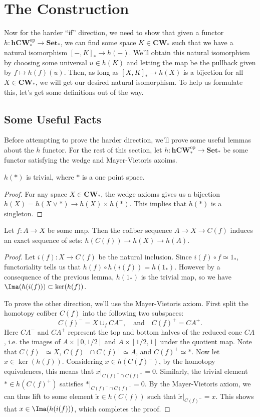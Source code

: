 \documentclass[11pt,letterpaper]{article}
\providecommand{\hcwop}{\mathbf{hCW}^{\textrm{op}}_*}
\providecommand{\cw}{\mathbf{CW}_*}
\providecommand{\Set}{\mathbf{Set}_*}
\begin{document}
\section{The Construction}

Now for the harder ``if'' direction, we need to show that given a functor $h : \hcwop \to \Set$, we can find some space $K\in \cw$ such that we have a natural isomorphism $[-,K]_* \to h(-)$. We'll obtain this natural isomorphism by choosing some universal $u\in h(K)$ and letting the map be the pullback given by $f \mapsto h(f)(u)$. Then, as long as $[X,K]_* \to h(X)$ is a bijection for all $X\in \cw$, we will get our desired natural isomorphism. To help us formulate this, let's get some definitions out of the way.

\subsection{Some Useful Facts}

Before attempting to prove the harder direction, we'll prove some useful lemmas about the $h$ functor. For the rest of this section, let $h : \hcwop \to \Set$ be some functor satisfying the wedge and Mayer-Vietoris axoims.

\begin{lemma}
    $h(*)$ is trivial, where $*$ is a one point space.
\end{lemma}
\begin{proof}
    For any space $X\in \cw$, the wedge axioms gives us a bijection $h(X)=h(X\vee *) \to h(X)\times h(*)$. This implies that $h(*)$ is a singleton.
\end{proof}

\begin{lemma}
    Let $f : A \to X$ be some map. Then the cofiber sequence $A \to X\to C(f)$ induces an exact sequence of sets: $h(C(f)) \to h(X) \to h(A)$.
\end{lemma}

\begin{proof}
    Let $i(f) : X \to C(f)$ be the natural inclusion. Since $i(f)\circ f \simeq 1_*$, functoriality tells us that $h(f)\circ h(i(f)) = h(1_*)$. However by a consequence of the previous lemma, $h(1_*)$ is the trivial map, so we have $\Ima(h(i(f)))\subset \ker(h(f))$.

    To prove the other direction, we'll use the Mayer-Vietoris axiom. First split the homotopy cofiber $C(f)$ into the following two subspaces:
    \[
        C(f)^- = X\cup_f CA^-,\quad\text{and}\quad C(f)^+ = CA^+
    .\]
    Here $CA^-$ and $CA^+$ represent the top and bottom halves of the reduced cone $CA$, i.e. the images of $A\times [0, 1/2]$ and $A\times [1/2,1]$ under the quotient map. Note that $C(f)^-\simeq X$, $C(f)^-\cap C(f)^+\simeq A$, and $C(f)^+\simeq *$. Now let $x\in\ker(h(f))$. Considering $x\in h(C(f)^-)$, by the homotopy equivalences, this means that $x|_{C(f)^-\cap C(f)^+} = 0$. Similarly, the trivial element $*\in h(C(f)^+)$ satisfies $*|_{C(f)^-\cap C(f)^+}=0$. By the Mayer-Vietoris axiom, we can thus lift to some element $\widetilde{x}\in h(C(f))$ such that $\widetilde{x}|_{C(f)^-} = x$. This shows that $x\in \Ima(h(i(f)))$, which completes the proof.  
\end{proof}
\end{document}
